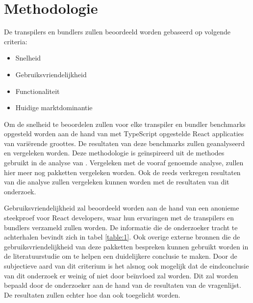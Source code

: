 

\section{Methodologie}
\label{sec:methodologie}

De transpilers en bundlers zullen beoordeeld worden gebaseerd op volgende criteria:

\begin{itemize}
  \item Snelheid
  \item Gebruiksvriendelijkheid
  \item Functionaliteit
  \item Huidige marktdominantie
\end{itemize}

Om de snelheid te beoordelen zullen voor elke transpiler en bundler benchmarks opgesteld worden aan de hand van met TypeScript opgestelde React applicaties van variërende groottes. De resultaten van deze benchmarks zullen geanalyseerd en vergeleken worden. Deze methodologie is geïnspireerd uit de methodes gebruikt in de analyse van \textcite{eaton_2021}. Vergeleken met de vooraf genoemde analyse, zullen hier meer nog pakketten vergeleken worden. Ook de reeds verkregen resultaten van die analyse zullen vergeleken kunnen worden met de resultaten van dit onderzoek.

Gebruiksvriendelijkheid zal beoordeeld worden aan de hand van een anonieme steekproef voor React developers, waar hun ervaringen met de transpilers en bundlers verzameld zullen worden.
De informatie die de onderzoeker tracht te achterhalen bevindt zich in tabel \ref{table:1}.
Ook overige externe bronnen die de gebruiksvriendelijkheid van deze pakketten bespreken kunnen gebruikt worden in de literatuurstudie om te helpen een duidelijkere conclusie te maken. Door de subjectieve aard van dit criterium is het alsnog ook mogelijk dat de eindconclusie van dit onderzoek er weinig of niet door beïnvloed zal worden. Dit zal worden bepaald door de onderzoeker aan de hand van de resultaten van de vragenlijst. De resultaten zullen echter hoe dan ook toegelicht worden.

